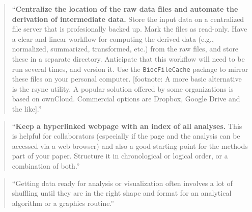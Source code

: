 \documentclass[]{tufte-book}
\begin{document}
\begin{quote}
``\textbf{Centralize the location of the raw data files and automate the derivation of
intermediate data.} Store the input data on a centralized file server that is
profesionally backed up. Mark the files as read-only. Have a clear and linear
workflow for computing the derived data (e.g., normalized, summarized, transformed,
etc.) from the raw files, and store these in a separate directory. Anticipate that
this workflow will need to be run several times, and version it. Use the
\texttt{BiocFileCache} package to mirror these files on your personal computer.
{[}footnote: A more basic alternative is the rsync utility. A popular solution offered
by some organizations is based on ownCloud. Commercial options are Dropbox,
Google Drive and the like{]}.'' \citep{holmes2018modern}
\end{quote}

\begin{quote}
``\textbf{Keep a hyperlinked webpage with an index of all analyses.} This is helpful
for collaborators (especially if the page and the analysis can be accessed via
a web browser) and also a good starting point for the methods part of your paper.
Structure it in chronological or logical order, or a combination of both.''
\citep{holmes2018modern}
\end{quote}

\begin{quote}
``Getting data ready for analysis or visualization often involves a lot of
shuffling until they are in the right shape and format for an analytical
algorithm or a graphics routine.'' \citep{holmes2018modern}
\end{quote}
\end{document}
